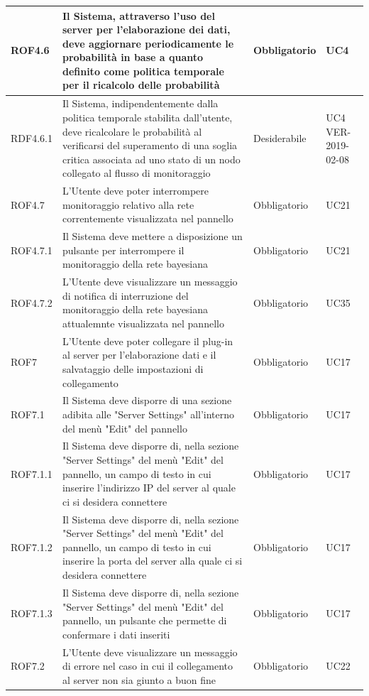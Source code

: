 \begin{center}
\begin{longtable}[c]{|m{}|m{}|m{}|m{}|}
ROF4.6 & Il Sistema, attraverso l'uso del server per l'elaborazione dei dati, deve aggiornare periodicamente le probabilità in base a quanto definito come politica temporale per il ricalcolo delle probabilità & Obbligatorio & UC4\\
\hline
\rowcolor{grigio}RDF4.6.1 & Il Sistema, indipendentemente dalla politica temporale stabilita dall'utente, deve ricalcolare le probabilità al verificarsi del superamento di una soglia critica associata ad uno stato di un nodo collegato al flusso di monitoraggio & Desiderabile & UC4 VER-2019-02-08\\
\hline
ROF4.7 & L'Utente deve poter interrompere monitoraggio relativo alla rete correntemente visualizzata nel pannello & Obbligatorio & UC21\\
\hline
\rowcolor{grigio}ROF4.7.1 & Il Sistema deve mettere a disposizione un pulsante per interrompere il monitoraggio della rete bayesiana & Obbligatorio & UC21\\
\hline
ROF4.7.2 & L'Utente deve visualizzare un messaggio di notifica di interruzione del monitoraggio della rete bayesiana attualemnte visualizzata nel pannello & Obbligatorio & UC35\\
\hline
\rowcolor{grigio}ROF7 & L'Utente deve poter collegare il plug-in al server per l'elaborazione dati e il salvataggio delle impostazioni di collegamento & Obbligatorio & UC17\\
\hline
ROF7.1 & Il Sistema deve disporre di una sezione adibita alle "Server Settings" all'interno del menù "Edit" del pannello & Obbligatorio & UC17\\
\hline
\rowcolor{grigio}ROF7.1.1 & Il Sistema deve disporre di, nella sezione "Server Settings" del menù "Edit" del pannello, un campo di testo in cui inserire l'indirizzo IP del server al quale ci si desidera connettere & Obbligatorio & UC17\\
\hline
ROF7.1.2 & Il Sistema deve disporre di, nella sezione "Server Settings" del menù "Edit" del pannello, un campo di testo in cui inserire la porta del server alla quale ci si desidera connettere & Obbligatorio & UC17\\
\hline
\rowcolor{grigio}ROF7.1.3 & Il Sistema deve disporre di, nella sezione "Server Settings" del menù "Edit" del pannello, un pulsante che permette di confermare i dati inseriti & Obbligatorio & UC17\\
\hline
ROF7.2 & L'Utente deve visualizzare un messaggio di errore nel caso in cui il collegamento al server non sia giunto a buon fine& Obbligatorio & UC22\\

\end{longtable}
\end{center}
